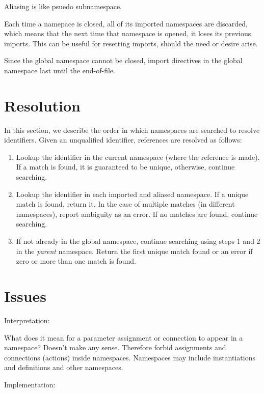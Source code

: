 Aliasing is like psuedo subnamespace.

Each time a namepace is closed, all of its imported namespaces are
discarded, which means that the next time that namespace is opened, 
it loses its previous imports.  
This can be useful for resetting imports, should the need or desire arise.  

Since the global namespace cannot be closed, 
import directives in the global namespace last until the end-of-file.  


\section{Resolution}
\label{sec:namespaces:resolution}

In this section, we describe the order in which namespaces are
searched to resolve identifiers.  
Given an unqualified identifier, references are resolved as follows:

\begin{enumerate}
\item Lookup the identifier in the current namespace 
	(where the reference is made).  
	If a match is found, it is guaranteed to be unique, 
	otherwise, continue searching.  
\item Lookup the identifier in each imported and aliased namespace.  
	If a unique match is found, return it.  
	In the case of multiple matches (in different namespaces), 
	report ambiguity as an error.  
	If no matches are found, continue searching.
\item If not already in the global namespace, 
	continue searching using steps 1 and 2 in the \emph{parent} namespace.  
	Return the first unique match found or an error if zero
	or more than one match is found.  
\end{enumerate}

\section{Issues}
\label{sec:namespaces:issues}

Interpretation:

What does it mean for a parameter assignment or connection to 
appear in a namespace?  
Doesn't make any sense.  
Therefore forbid assignments and connections (actions) inside namespaces.  
Namespaces may include instantiations and definitions and other namespaces.  

Implementation:

